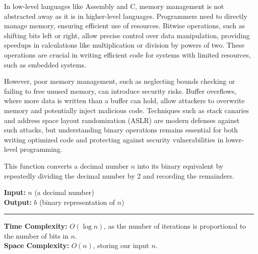 \begin{Tip}

    In low-level languages like Assembly and C, memory management is not abstracted away as it is in higher-level languages. Programmers need to directly manage memory, ensuring efficient use of resources. Bitwise operations, such as shifting bits left or right, allow precise control over data manipulation, providing speedups in calculations like multiplication or division by powers of two. These operations are crucial in writing efficient code for systems with limited resources, such as embedded systems.

    However, poor memory management, such as neglecting bounds checking or failing to free unused memory, can introduce security risks. Buffer overflows, where more data is written than a buffer can hold, allow attackers to overwrite memory and potentially inject malicious code. Techniques such as stack canaries and address space layout randomization (ASLR) are modern defenses against such attacks, but understanding binary operations remains essential for both writing optimized code and protecting against security vulnerabilities in lower-level programming.

\end{Tip}


\newpage
\begin{Func}
    This function converts a decimal number $n$ into its binary equivalent by repeatedly dividing the decimal number by 2 and recording the remainders.

    \vspace{.5em}
    \noindent
    \textbf{Input:} $n$ (a decimal number)\\
    \textbf{Output:} $b$ (binary representation of $n$)\\

    \begin{algorithm}[H]
        \SetAlgoLined
    \end{algorithm}
    \noindent\rule{\textwidth}{0.4pt}
    
    \noindent
    \textbf{Time Complexity:} $O(\log n)$, as the number of iterations is proportional to the number of bits in $n$.\\
    \textbf{Space Complexity:} $O(n)$, storing our input $n$.
\end{Func}

